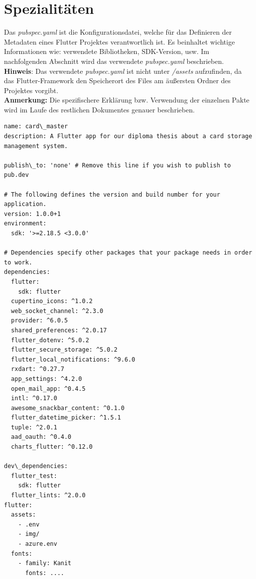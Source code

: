 \section{Spezialit\"aten}
\label{pubspec.yaml}
Das {\textit {pubspec.yaml}} ist die Konfigurationsdatei, welche für das Definieren der Metadaten eines Flutter Projektes verantwortlich ist. Es beinhaltet wichtige Informationen wie: verwendete Bibliotheken, SDK-Version, usw. Im nachfolgenden Abschnitt wird das verwendete {\textit {pubspec.yaml}} beschrieben. \\
{\textbf {Hinweis}:} Das verwendete {\textit {pubspec.yaml}} ist nicht unter {\textit {/assets}} aufzufinden, da das Flutter-Framework den Speicherort des Files am äußersten Ordner des Projektes vorgibt.\\ {\bf{Anmerkung}:} Die spezifischere Erklärung bzw. Verwendung der einzelnen Pakte wird im Laufe des restlichen Dokumentes genauer beschrieben.
\newpage
\begin{lstlisting}[caption={Konfigurationdatei pubspec.yaml},style=goMono]
name: card\_master
description: A Flutter app for our diploma thesis about a card storage management system.

publish\_to: 'none' # Remove this line if you wish to publish to pub.dev

# The following defines the version and build number for your application.
version: 1.0.0+1
environment:
  sdk: '>=2.18.5 <3.0.0'

# Dependencies specify other packages that your package needs in order to work.
dependencies: 
  flutter:
    sdk: flutter
  cupertino_icons: ^1.0.2
  web_socket_channel: ^2.3.0
  provider: ^6.0.5
  shared_preferences: ^2.0.17
  flutter_dotenv: ^5.0.2
  flutter_secure_storage: ^5.0.2
  flutter_local_notifications: ^9.6.0
  rxdart: ^0.27.7
  app_settings: ^4.2.0
  open_mail_app: ^0.4.5
  intl: ^0.17.0
  awesome_snackbar_content: ^0.1.0
  flutter_datetime_picker: ^1.5.1
  tuple: ^2.0.1
  aad_oauth: ^0.4.0
  charts_flutter: ^0.12.0

dev\_dependencies:
  flutter_test:
    sdk: flutter
  flutter_lints: ^2.0.0
flutter:
  assets:
    - .env
    - img/
    - azure.env
  fonts:
    - family: Kanit
      fonts: ....
\end{lstlisting}

\newpage

